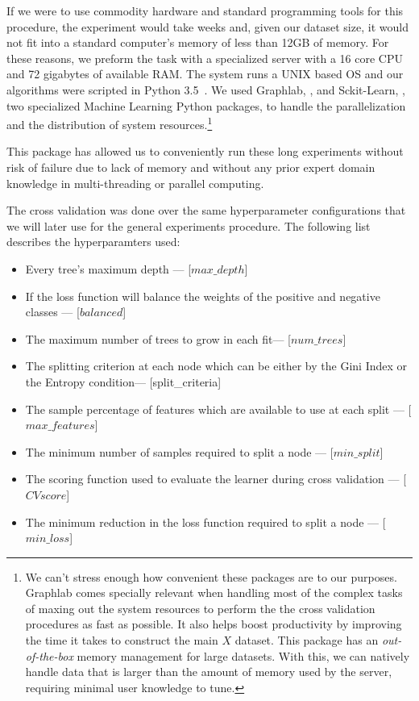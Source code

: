 If we were to use commodity hardware and standard programming tools for this procedure, the experiment would take weeks and, given our dataset size, it would not fit into a standard computer's memory of less than 12GB of memory.
For these reasons, we preform the task with a specialized server with a 16 core CPU and 72 gigabytes of available RAM.\@
The system runs a UNIX based OS and our algorithms were scripted in Python 3.5~\citep{python3.5}.
We used Graphlab, \citep{graphlab}, and Sckit-Learn, \citep{scikit-learn}, two specialized Machine Learning Python packages, to handle the parallelization and the distribution of system resources.\footnote{We can't stress enough how convenient these packages are to our purposes.
Graphlab comes specially relevant when handling most of the complex tasks of maxing out the system resources to perform the the cross validation procedures as fast as possible.
It also helps boost productivity by improving the time it takes to construct the main $X$ dataset.
This package has an \textit{out-of-the-box} memory management for large datasets.
With this, we can natively handle data that is larger than the amount of memory used by the server, requiring minimal user knowledge to tune.}

This package has allowed us to conveniently run these long experiments without risk of failure due to lack of memory and without any prior expert domain knowledge in multi-threading or parallel computing.


The cross validation was done over the same hyperparameter configurations that we will later use for the general experiments procedure.
The following list describes the hyperparamters used:

\begin{itemize}\label{list:random_forest_grid_search_params}

  \item Every tree's maximum depth --- [$max\_depth$]
  \item If the loss function will balance the weights of the positive and negative classes --- [$balanced$]
  \item The maximum number of trees to grow in each fit--- [$num\_trees$]
  \item The splitting criterion at each node which can be either by the Gini Index or the Entropy condition--- [split\_criteria]
  \item The sample percentage of features which are available to use at each split --- [$max\_features$]
  \item The minimum number of samples required to split a node --- [$min\_split$]
  \item The scoring function used to evaluate the learner during cross validation --- [$CV score$]
  \item The minimum reduction in the loss function required to split a node  --- [$min\_loss$]
\end{itemize}

